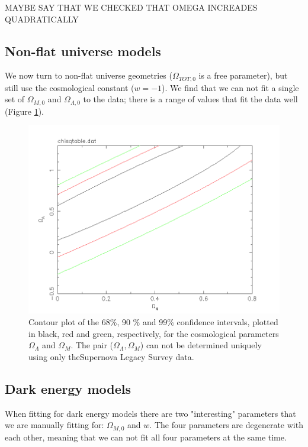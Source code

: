 \documentclass[11pt]{article}
\begin{document}
MAYBE SAY THAT WE CHECKED THAT OMEGA INCREADES QUADRATICALLY



\subsection{Non-flat universe models}
We now turn to non-flat universe geometries ($\Omega_{TOT,0} $ is a free parameter), but still use the cosmological constant ($w = -1$). We find that we can not fit a single set of $\Omega_{M,0}$ and $\Omega_{\Lambda,0}$ to the data; there is a range of values that fit the data well (Figure \ref{fig:nonflat}). 
\begin{figure}[htbp]
	\centering
	\includegraphics[width=0.8\linewidth]{nonflat.png}
	\caption{Contour plot of the 68\%, 90 \% and 99\% confidence intervals, plotted in black, red and green, respectively, for the cosmological parameters $\Omega_\Lambda$ and $\Omega_M$. The pair ($\Omega_\Lambda, \Omega_M$) can not be determined uniquely using only theSupernova Legacy Survey data.}
	\label{fig:nonflat}
\end{figure}

\subsection{Dark energy models}
When fitting for dark energy models there are two "interesting" parameters that we are manually fitting for: $\Omega_{M,0}$ and $w$. The four parameters are degenerate with each other, meaning that we can not fit all four parameters at the same time. 
\end{document}
